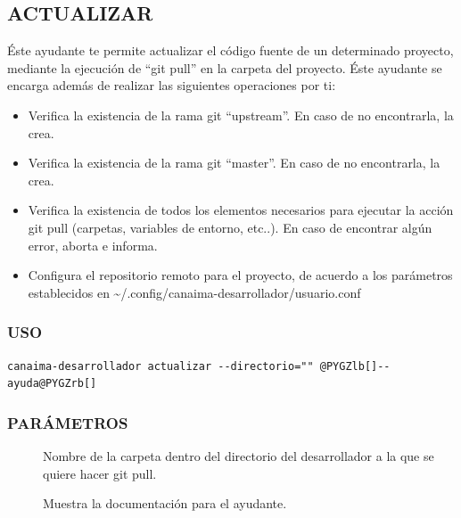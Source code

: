 \documentclass[letterpaper,12pt,spanish]{manual}
\begin{document}
\subsection{\textbf{ACTUALIZAR}}

Éste ayudante te permite actualizar el código fuente de un determinado proyecto, mediante la ejecución de ``git pull'' en la carpeta del proyecto. Éste ayudante se encarga además de realizar las siguientes operaciones por ti:
\begin{itemize}
\item {} 
Verifica la existencia de la rama git ``upstream''. En caso de no encontrarla, la crea.

\item {} 
Verifica la existencia de la rama git ``master''. En caso de no encontrarla, la crea.

\item {} 
Verifica la existencia de todos los elementos necesarios para ejecutar la acción git pull (carpetas, variables de entorno, etc..). En caso de encontrar algún error, aborta e informa.

\item {} 
Configura el repositorio remoto para el proyecto, de acuerdo a los parámetros establecidos en \textasciitilde{}/.config/canaima-desarrollador/usuario.conf

\end{itemize}


\subsubsection{USO}

\begin{Verbatim}[commandchars=@\[\]]
canaima-desarrollador actualizar --directorio="" @PYGZlb[]--ayuda@PYGZrb[]
\end{Verbatim}


\subsubsection{PARÁMETROS}
\begin{description}
\item[{}] \leavevmode
Nombre de la carpeta dentro del directorio del desarrollador a la que se quiere hacer git pull.

\item[{}] \leavevmode
Muestra la documentación para el ayudante.

\end{description}
\end{document}
